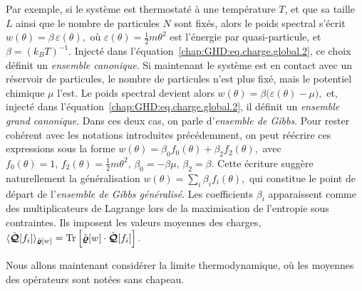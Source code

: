 Par exemple, si le système est thermostaté à une température $T$, et que sa
taille $L$ ainsi que le nombre de particules $N$ sont fixés, alors le poids
spectral s’écrit \( w(\theta) = \beta \, \varepsilon(\theta), \) où
$\varepsilon(\theta) = \tfrac{1}{2} m \theta^2$ est l’énergie par
quasi-particule, et $\beta = (k_B T)^{-1}$. Injecté dans
l’équation~\eqref{chap:GHD:eq.charge.global.2}, ce choix définit un
\emph{ensemble canonique}. Si maintenant le système est en contact avec un
réservoir de particules, le nombre de particules n’est plus fixé, mais le
potentiel chimique $\mu$ l’est. Le poids spectral devient alors \( w(\theta) =
\beta \bigl(\varepsilon(\theta) - \mu\bigr), \) et, injecté dans
l’équation~\eqref{chap:GHD:eq.charge.global.2}, il définit un \emph{ensemble
    grand canonique}. Dans ces deux cas, on parle d’\emph{ensemble de Gibbs}. Pour
rester cohérent avec les notations introduites précédemment, on peut réécrire
ces expressions sous la forme \( w(\theta) = \beta_0 f_0(\theta) + \beta_2
f_2(\theta), \) avec \( f_0(\theta) = 1, \, f_2(\theta) = \tfrac{1}{2} m
\theta^2, \, \beta_0 = -\beta \mu, \, \beta_2 = \beta. \) Cette écriture
suggère naturellement la généralisation \( w(\theta) = \sum_i \beta_i
f_i(\theta), \) qui constitue le point de départ de l’\emph{ensemble de Gibbs
    généralisé}. Les coefficients $\beta_i$ apparaissent comme des multiplicateurs
de Lagrange lors de la maximisation de l’entropie sous contraintes. Ils
imposent les valeurs moyennes des charges, \( \langle
\hat{\boldsymbol{\mathcal{Q}}}[f_i] \rangle_{\hat{\boldsymbol{\varrho}}[w]} = \mathrm{Tr}
\left[ \hat{\boldsymbol{\varrho}}[w] \cdot \hat{\boldsymbol{\mathcal{Q}}}[f_i] \right]. \)


\newpage

Nous allons maintenant considérer la limite thermodynamique, où les moyennes
des opérateurs sont notées sans chapeau.


